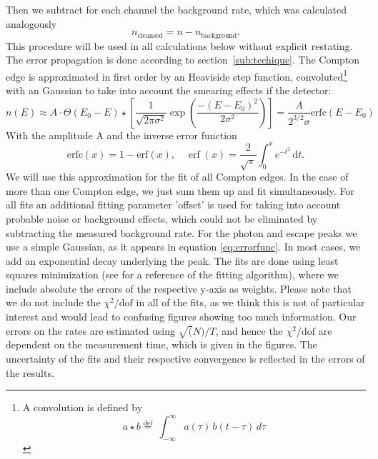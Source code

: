 Then we subtract for each channel the background rate, which
was calculated analogously 
\begin{equation}
    n_\mathrm{cleansed} = n - n_\mathrm{background}.
    \label{eq:rate2}
\end{equation}
This procedure will be used in all calculations below without explicit restating. 
The error propagation is done according to section~\ref{sub:techique}.
The Compton edge is approximated in first order by an Heaviside step function,
convoluted\footnote{ 
    A convolution is defined by
\begin{equation}
    a \star b   \stackrel{\mathrm{def}}{=}\ \int_{-\infty}^\infty a(\tau)\, b(t - \tau)\, d\tau 	
    \label{eq:conv}
\end{equation}

} with an Gaussian to take into account the smearing
effects if the detector:
\begin{equation}
    n(E)  \approx A\cdot \Theta(E_0 - E) \star  	
    \left[  \frac{1}{\sqrt{2\pi\sigma^2}} \exp \left( 
        \frac{-(E-E_0)^2}{2\sigma^2}\right)
        \right]  =\frac{A}{2^{3/2}\sigma} 
    \mathrm{erfc}(E - E_0) 
    \label{eq:errorfunc}
\end{equation}
With the amplitude A and the inverse error function
\begin{equation}
    \mathrm{erfc}(x) = 1 - \mathrm{erf}(x) , \quad
    \operatorname{erf}(x) = 
    \frac{2}{\sqrt\pi}\int_0^x e^{-t^2}\,\mathrm dt. 
    \label{eq:erfc}
\end{equation}
We will use this approximation for the fit of all Compton 
edges. In the case of more than one Compton edge, we just
sum them up and fit simultaneously. For all fits an additional fitting parameter 'offset'
is used for taking into account probable noise or background
effects, which could not be eliminated by subtracting the 
measured background rate. For the photon and escape peaks we use 
a simple Gaussian, as it appears in equation \eqref{eq:errorfunc}.
In most cases, we add an exponential decay underlying the peak.
The fits are done using least squares minimization (see 
\cite{scipy} for a reference of the fitting algorithm), where 
we include absolute the errors of the respective y-axis as 
weights. Please note
that we do not include the $\chi^2/\mathrm{dof}$ in all of the fits,
as we think this is not of particular interest and would lead
to confusing figures showing too much information. Our errors
on the rates are estimated using $\sqrt(N)/T$, and hence
the $\chi^2/\mathrm{dof}$ are dependent 
on the measurement time, which is given in the figures. 
The uncertainty of the fits and their
respective convergence is reflected in the errors of the 
results. 

